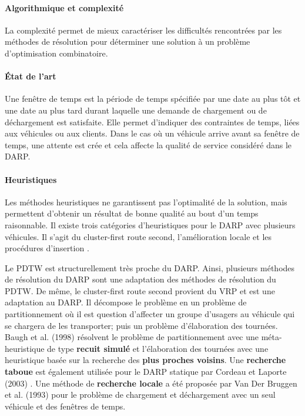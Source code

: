 \documentclass{article}
\begin{document}
\paragraph{Algorithmique et complexité}
La complexité permet de mieux caractériser les difficultés rencontrées par les méthodes de résolution pour déterminer une solution à un problème d'optimisation combinatoire.

\paragraph{État de l'art}
Une fenêtre de temps est la période de temps spécifiée par une date au plus tôt et une date au plus tard durant laquelle une demande de chargement ou de déchargement est satisfaite. Elle permet d'indiquer des contraintes de temps, liées aux véhicules ou aux clients. Dans le cas où un véhicule arrive avant sa fenêtre de temps, une attente est crée et cela affecte la qualité de service considéré dans le DARP.

\paragraph{Heuristiques}
Les méthodes heuristiques ne garantissent pas l'optimalité de la solution, mais permettent d'obtenir un résultat de bonne qualité au bout d'un temps raisonnable. Il existe trois catégories d'heuristiques pour le DARP avec plusieurs véhicules. Il s'agit du cluster-first route second, l'amélioration locale et les procédures d'insertion \cite{13}. 

	Le PDTW est structurellement très proche du DARP. Ainsi, plusieurs méthodes de résolution du DARP sont une adaptation des méthodes de résolution du PDTW. De même, le cluster-first route second provient du VRP et est une adaptation au DARP. Il décompose le problème en un problème de partitionnement où il est question d'affecter un groupe d'usagers au véhicule qui se chargera de les transporter; puis un problème d'élaboration des tournées. Baugh et al. (1998) \cite{10-113} résolvent le problème de partitionnement avec une méta-heuristique de type \textbf{recuit simulé} et l'élaboration des tournées avec une heuristique basée sur la recherche des \textbf{plus proches voisins}. Une \textbf{recherche taboue} est également utilisée pour le DARP statique par Cordeau et Laporte (2003) \cite{10-77}. Une méthode de \textbf{recherche locale} a été proposée par Van Der Bruggen et al. (1993) \cite{10-72} pour le problème de chargement et déchargement avec un seul véhicule et des fenêtres de temps.
	
\end{document}

